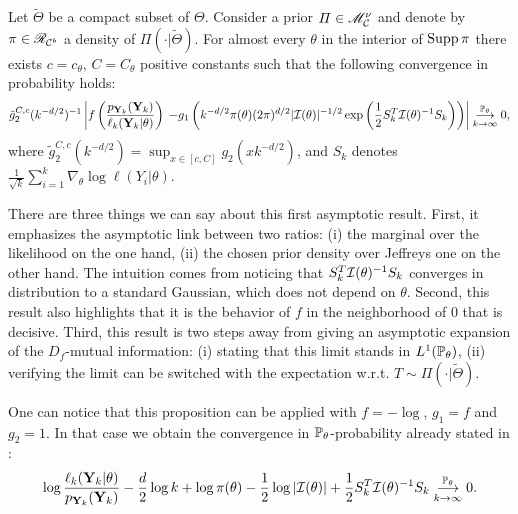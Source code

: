 \begin{prop}\label{prop:PSGSA:cvptheta}
    Let $\tilde\Theta$ be a compact subset of $\Theta$.
    Consider a prior $\varPi\in\sM^\nu_\cC$ and denote by $\pi\in\sR_{\cC^b}$ a density of $\varPi(\cdot|\tilde\Theta)$. %
    For almost every $\theta$ in the interior of $\Supp\pi$ there exists $c=c_\theta,\,C=C_\theta$ positive constants such that the following convergence in probability holds:
    \begin{equation}
        \label{eq:cvinproba}
        \tilde g_2^{C,c}(k^{-d/2})^{-1}\left| f\left(\frac{p_{\mbf Y_k}(\mbf Y_k)}{\ell_k(\mbf Y_k|\theta)}\right) \right.            \left. - g_1\left(k^{-d/2}\pi(\theta)(2\pi)^{d/2}|\cI(\theta)|^{-1/2}\exp\left(\frac{1}{2}S_k^T\cI(\theta)^{-1}S_k \right)\right) \right| %
                \conv[\PP_{\theta}]{k\rightarrow\infty} 0,
    \end{equation}
    where $\tilde g_2^{C,c}(k^{-d/2})=\sup_{x\in[c,C]} g_2(xk^{-d/2})$, and $S_k$ denotes $\frac{1}{\sqrt{k}}\sum_{i=1}^k\nabla_\theta\log\ell(Y_i|\theta)$.
\end{prop}


There are three things we can say about this first asymptotic result. %
First, it emphasizes the asymptotic link {between two ratios: (i) the marginal over the likelihood on the one hand, (ii) the chosen prior density over Jeffreys one on the other hand.}  
The intuition comes from noticing that $S_k^T\cI(\theta)^{-1}S_k$ converges in distribution to a standard Gaussian, which does not depend on $\theta$.
Second, 
this result also highlights that it is the behavior of $f$ in the neighborhood of $0$ that is decisive.
Third, this result is two steps away from giving an asymptotic expansion of the $D_f$-mutual information: (i) stating that this limit stands in $L^1(\PP_{\theta})$, (ii) verifying the limit can be switched with the expectation w.r.t. $T\sim\varPi(\cdot|\tilde\Theta)$.




One can notice that this proposition can be applied with $f=-\log$, $g_1=f$ and $g_2=1$. 
In that case we obtain the convergence in $\PP_\theta$-probability already stated in \cite{clarke_information-theoretic_1990}:
    \begin{equation}
        \log\frac{\ell_k(\mbf Y_k|\theta)}{p_{\mbf Y_k}(\mbf Y_k)} - \frac{d}{2}\log k + \log\pi(\theta) - \frac{1}{2}\log|\cI(\theta)| +\frac{1}{2}S_k^T\cI(\theta)^{-1}S_k  \conv[\PP_\theta]{k\rightarrow\infty} 0.
    \end{equation}







